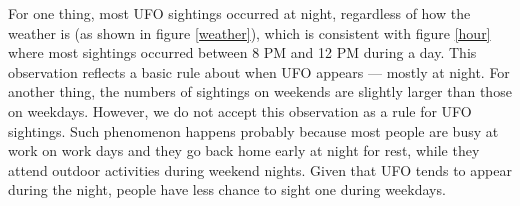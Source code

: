 For one thing, most UFO sightings occurred at night, regardless of how the weather is (as shown in figure \ref{weather}), which is consistent with figure \ref{hour} where most sightings occurred between 8 PM and 12 PM during a day. This observation reflects a basic rule about when  UFO appears --- mostly at night. For another thing, the numbers of sightings on weekends are slightly larger than those on weekdays. However, we do not accept this observation as a rule for UFO sightings. Such phenomenon happens probably because most people are busy at work on work days and they go back home early at night for rest, while they attend outdoor activities during weekend nights. Given that UFO tends to appear during the night, people have less chance to sight one during weekdays.





